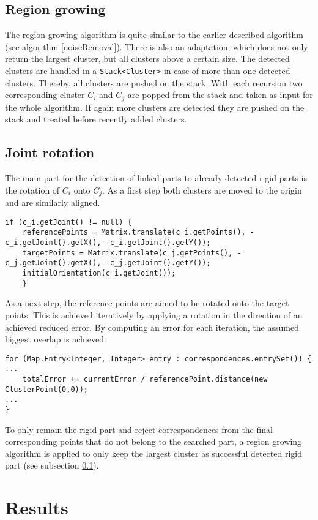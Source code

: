 \subsection{Region growing}
\label{RegionGrowing}
The region growing algorithm is quite similar to the earlier described algorithm (see algorithm \ref{noiseRemoval}). There is also an adaptation, which does not only return the largest cluster, but all clusters above a certain size. The detected clusters are handled in a \texttt{Stack<Cluster>} in case of more than one detected clusters. Thereby, all clusters are pushed on the stack. With each recursion two corresponding cluster $C_i$ and $C_j$ are popped from the stack and taken as input for the whole algorithm. If again more clusters are detected they are pushed on the stack and treated before recently added clusters.

\subsection{Joint rotation}
The main part for the detection of linked parts to already detected rigid parts is the rotation of $C_i$ onto $C_j$. As a first step both clusters are moved to the origin and are similarly aligned.
\begin{lstlisting}
if (c_i.getJoint() != null) {
	referencePoints = Matrix.translate(c_i.getPoints(), -c_i.getJoint().getX(), -c_i.getJoint().getY());
	targetPoints = Matrix.translate(c_j.getPoints(), -c_j.getJoint().getX(), -c_j.getJoint().getY());
	initialOrientation(c_i.getJoint());
	}
\end{lstlisting}
As a next step, the reference points are aimed to be rotated onto the target points. This is achieved iteratively by applying a rotation in the direction of an achieved reduced error. By computing an error for each iteration, the assumed biggest overlap is achieved.
\begin{lstlisting}
for (Map.Entry<Integer, Integer> entry : correspondences.entrySet()) {
...
	totalError += currentError / referencePoint.distance(new ClusterPoint(0,0));	
...	
}
\end{lstlisting}
To only remain the rigid part and reject correspondences from the final corresponding points that do not belong to the searched part, a region growing algorithm is applied to only keep the largest cluster as successful detected rigid part (see subsection \ref{RegionGrowing}).

\section{Results}
\label{ResultsLRP}

